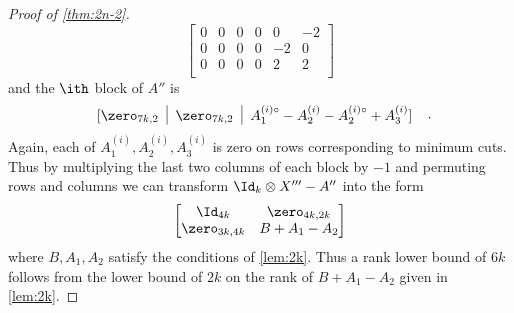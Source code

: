 \begin{proof}[Proof of \cref{thm:2n-2}]
\[\begin{bmatrix}
0 &  0 &  0 &  0 &  0 &  -2 \\
0 &  0 &  0 &  0 &  -2 &  0 \\
0 &  0 &  0 &  0 &  2 &  2 \\
\end{bmatrix}
\]
and the $\ith$ block of $A''$ is
\[
\begin{tabular}{c|c|c}
$[\zero_{7k,2}$ & $\zero_{7k,2}$ & $A_1^{(i)\circ} -A_2^{(i)} - A_2^{(i)\circ} + A_3^{(i)}]$
\end{tabular}
\enspace.
\]
Again, each of $A_1^{(i)}, A_2^{(i)}, A_3^{(i)}$ is zero on rows corresponding to minimum cuts.  Thus by multiplying the last two columns of
each block by $-1$ and permuting rows and columns we can transform $\Id_k \otimes X''' - A''$ into the form
\[
\begin{bmatrix}
\Id_{4k} & \zero_{4k,2k} \\
\zero_{3k,4k} & B +A_1 - A_2
\end{bmatrix}
\]
where $B,A_1, A_2$ satisfy the conditions of \cref{lem:2k}.  Thus a rank lower bound of $6k$ follows from the lower
bound of $2k$ on the rank of $B+A_1-A_2$ given in \cref{lem:2k}.
\end{proof}

